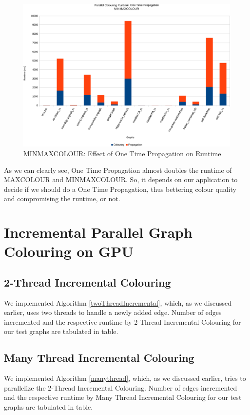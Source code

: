 \documentclass[MTech]{iitmdiss}
\begin{document}
\begin{figure}[h]
    \centering
    \includegraphics[width=\textwidth,keepaspectratio=true]{chartNewest10.pdf}
    \caption{
        MINMAXCOLOUR: Effect of One Time Propagation on Runtime
    }
    \label{fig:chart10}
\end{figure}

As we can clearly see, One Time Propagation almost doubles the runtime of MAXCOLOUR and MINMAXCOLOUR. So, it depends on our application to decide if we should do a One Time Propagation, thus bettering colour quality and compromising the runtime, or not.

\section{Incremental Parallel Graph Colouring on GPU}
\subsection{2-Thread Incremental Colouring}
We implemented Algorithm \ref{twoThreadIncremental}, which, as we discussed earlier, uses two threads to handle a newly added edge. Number of edges incremented and the respective runtime by 2-Thread Incremental Colouring for our test graphs are tabulated in table.

\subsection{Many Thread Incremental Colouring}
We implemented Algorithm \ref{manythread}, which, as we discussed earlier, tries to parallelize the 2-Thread Incremental Colouring. Number of edges incremented and the respective runtime by Many Thread Incremental Colouring for our test graphs are tabulated in table.
\end{document}
